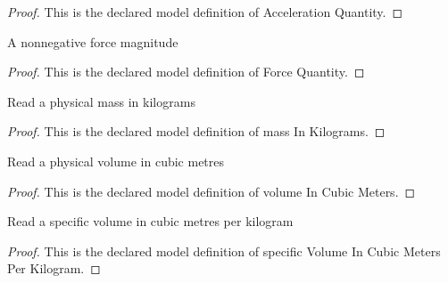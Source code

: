\begin{proof}
  This is the declared model definition of Acceleration Quantity.
\end{proof}
\begin{definition}
  \label{def:physics:phyx-mini-0463:phyxminiproblems-problemphyxmini0463-forcequantity}
  A nonnegative force magnitude
\end{definition}
\begin{proof}
  This is the declared model definition of Force Quantity.
\end{proof}
\begin{definition}
  \label{def:physics:phyx-mini-0463:phyxminiproblems-problemphyxmini0463-massinkilograms}
  Read a physical mass in kilograms
\end{definition}
\begin{proof}
  This is the declared model definition of mass In Kilograms.
\end{proof}
\begin{definition}
  \label{def:physics:phyx-mini-0463:phyxminiproblems-problemphyxmini0463-volumeincubicmeters}
  Read a physical volume in cubic metres
\end{definition}
\begin{proof}
  This is the declared model definition of volume In Cubic Meters.
\end{proof}
\begin{definition}
  \label{def:physics:phyx-mini-0463:phyxminiproblems-problemphyxmini0463-specificvolumeincubicmetersperkilogram}
  Read a specific volume in cubic metres per kilogram
\end{definition}
\begin{proof}
  This is the declared model definition of specific Volume In Cubic Meters Per Kilogram.
\end{proof}
